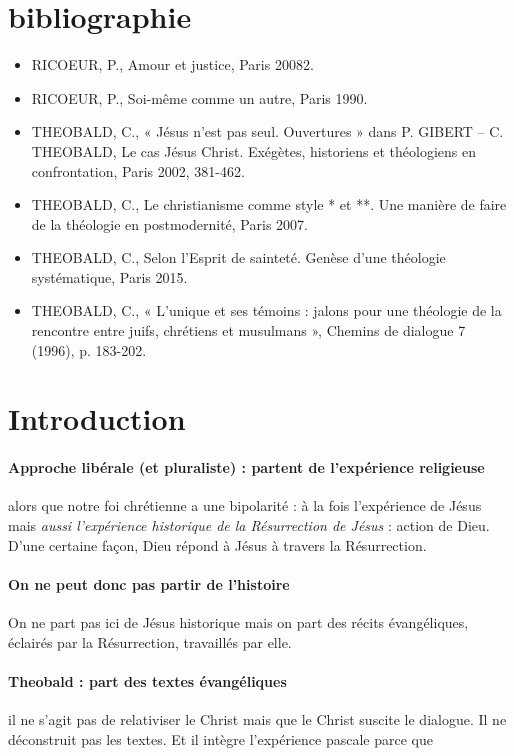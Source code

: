\section{bibliographie}

\begin{itemize}
    \item RICOEUR, P., Amour et justice, Paris 20082.
   \item RICOEUR, P., Soi-même comme un autre, Paris 1990.
   \item THEOBALD, C., « Jésus n’est pas seul. Ouvertures » dans P. GIBERT – C. THEOBALD, Le cas
Jésus Christ. Exégètes, historiens et théologiens en confrontation, Paris 2002, 381-462.
   \item THEOBALD, C., Le christianisme comme style * et **. Une manière de faire de la théologie en
postmodernité, Paris 2007. \cite{theobald_christianisme_2007} 
   \item THEOBALD, C., Selon l’Esprit de sainteté. Genèse d’une théologie systématique, Paris 2015.
   \item THEOBALD, C., « L’unique et ses témoins : jalons pour une théologie de la rencontre entre
juifs, chrétiens et musulmans », Chemins de dialogue 7 (1996), p. 183-202.
\end{itemize}

\section{Introduction}


\paragraph{Approche libérale (et pluraliste) : partent de l'expérience religieuse} alors que notre foi chrétienne a une bipolarité : à la fois l'expérience de Jésus mais \textit{aussi l'expérience historique de la Résurrection de Jésus} : action de Dieu. D'une certaine façon, Dieu répond à Jésus à travers la Résurrection.

\paragraph{On ne peut donc pas partir de l'histoire} On ne part pas ici de Jésus historique mais on part des récits évangéliques, éclairés par la Résurrection, travaillés par elle.


\paragraph{Theobald : part des textes évangéliques} il ne s'agit pas de relativiser le Christ mais que le Christ suscite le dialogue. Il ne déconstruit pas les textes. Et il intègre l'expérience pascale parce que 

